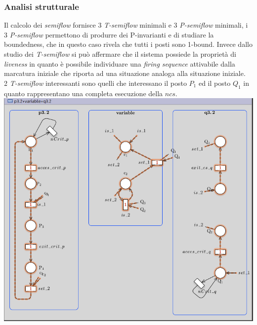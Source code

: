 \documentclass[a4paper]{article}
\begin{document}
\subsubsection{Analisi strutturale}
Il calcolo dei \textit{semiflow} fornisce 3 \textit{T-semiflow} minimali e 3 \textit{P-semiflow} minimali, i 3 \textit{P-semiflow} permettono di produrre dei P-invarianti e di studiare la boundedness, che in questo caso rivela che tutti i posti sono 1-bound.
Invece dallo studio dei \textit{T-semiflow} si può affermare che il sistema possiede la proprietà di \textit{liveness} in quanto è possibile individuare una \textit{ﬁring sequence} attivabile dalla marcatura iniziale che riporta ad una situazione analoga alla situazione iniziale.\\
2 \textit{T-semiflow} interessanti sono quelli che interessano il posto $P_1$ ed il posto  $Q_1$ in quanto rappresentano una completa esecuzione della $ncs$.\\
\includegraphics[width=1\textwidth]{3.2T.png}
\end{document}
